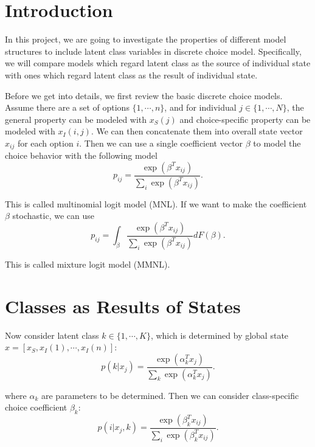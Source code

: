 \documentclass[english]{article}
\begin{document}
\section{Introduction}

In this project, we are going to investigate the properties of different model structures to include latent class variables in discrete choice model. Specifically, we will compare models which regard latent class as the source of individual state with ones which regard latent class as the result of individual state.

Before we get into details, we first review the basic discrete choice models. Assume there are a set of options $\{1,\cdots,n\}$, and for individual $j\in\{1,\cdots,N\}$, the general property can be modeled with $x_S(j)$ and choice-specific property can be modeled with $x_I(i,j)$. We can then concatenate them into overall state vector $x_{ij}$ for each option $i$. Then we can use a single coefficient vector $\beta$ to model the choice behavior with the following model
\begin{equation}\nonumber
  p_{ij} = \frac{\exp(\beta^Tx_{ij})}{\sum_i\exp(\beta^Tx_{ij})}.
\end{equation}

\noindent This is called multinomial logit model (MNL). If we want to make the coefficient $\beta$ stochastic, we can use
\begin{equation}\nonumber
  p_{ij} = \int_{\beta}\frac{\exp(\beta^Tx_{ij})}{\sum_i\exp(\beta^Tx_{ij})}dF(\beta).
\end{equation}

\noindent This is called mixture logit model (MMNL).

\section{Classes as Results of States}

Now consider latent class $k\in\{1,\cdots,K\}$, which is determined by global state $x = [x_S,x_I(1),\cdots,x_I(n)]$:
\begin{equation}\nonumber
  p(k|x_j) = \frac{\exp(\alpha_k^Tx_j)}{\sum_k\exp(\alpha_k^Tx_j)}.
\end{equation}

\noindent where $\alpha_k$ are parameters to be determined. Then we can consider class-specific choice coefficient $\beta_k$:
\begin{equation}\nonumber
  p(i|x_j,k) = \frac{\exp(\beta_k^Tx_{ij})}{\sum_i\exp(\beta_k^Tx_{ij})}.
\end{equation}
\end{document}
